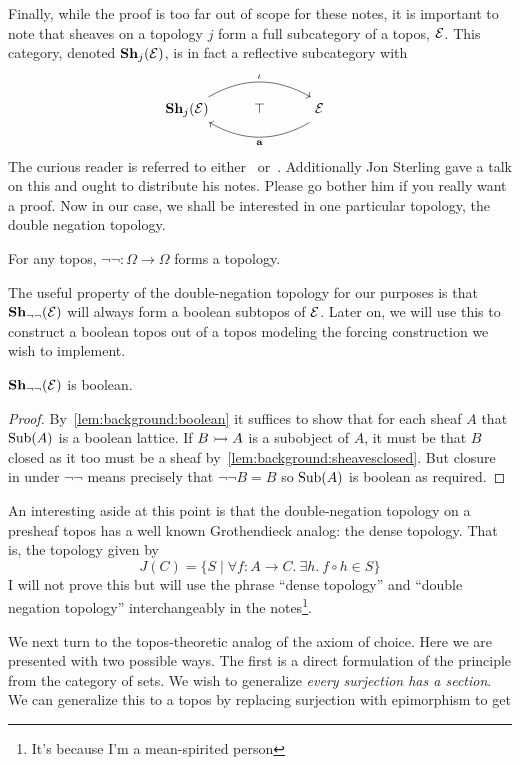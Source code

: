 Finally, while the proof is too far out of scope for these notes, it
is important to note that sheaves on a topology $j$ form a full
subcategory of a topos, $\Etop$. This category, denoted
$\sheaves[j]{\Etop}$, is in fact a reflective subcategory with
\[
  \begin{tikzcd}
    \sheaves[j]{\Etop} \ar[rr, bend left, "\iota"] & \top &
    \makebox[0pt]{\phantom{\textbf{Sh}}$\Etop$}\phantom{\sheaves[j]{\Etop}}
    \ar[ll, bend left, "\sheafify"]
  \end{tikzcd}
\]
The curious reader is referred to either~\citet{MacLane:92}
or~\citet{Johnstone:14}. Additionally Jon Sterling gave a talk on this
and ought to distribute his notes. Please go bother him if you really
want a proof. Now in our case, we shall be interested in one
particular topology, the double negation topology.
\begin{example}\label{ex:background:doublenegation}
  For any topos, $\neg\neg : \Omega \to \Omega$ forms a topology.
\end{example}
The useful property of the double-negation topology for our purposes
is that $\sheaves[\neg\neg]{\Etop}$ will always form a boolean
subtopos of $\Etop$. Later on, we will use this to construct a boolean
topos out of a topos modeling the forcing construction we wish to
implement.

\begin{lem}\label{lem:background:notnotboolean}
  $\sheaves[\neg\neg]{\Etop}$ is boolean.
\end{lem}
\begin{proof}
  By~\ref{lem:background:boolean} it suffices to show that for each
  sheaf $A$ that $\sub(A)$ is a boolean lattice. If $B \mono A$ is a
  subobject of $A$, it must be that $B$ closed as it too must be a
  sheaf by~\ref{lem:background:sheavesclosed}. But closure in under
  $\neg\neg$ means precisely that $\neg \neg B = B$ so $\sub(A)$ is
  boolean as required.
\end{proof}

An interesting aside at this point is that the double-negation
topology on a presheaf topos has a well known Grothendieck analog: the
dense topology. That is, the topology given by
\[
  J(C) = \{ S \mid \forall f : A \to C.\ \exists h.\ f \circ h \in S\}
\]
I will not prove this but will use the phrase ``dense topology'' and
``double negation topology'' interchangeably in the
notes\footnote{It's because I'm a mean-spirited person}.

We next turn to the topos-theoretic analog of the axiom of
choice. Here we are presented with two possible ways. The first is a
direct formulation of the principle from the category of sets. We wish
to generalize \emph{every surjection has a section}. We can generalize
this to a topos by replacing surjection with epimorphism to get

